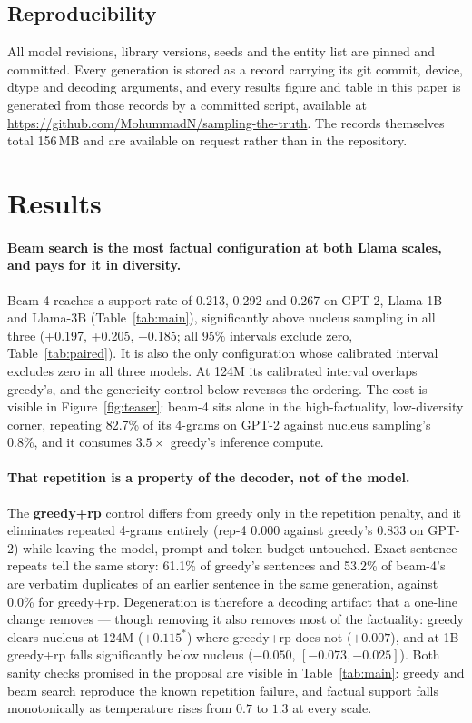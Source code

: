 \documentclass[11pt]{article}
\begin{document}
\subsection{Reproducibility}

All model revisions, library versions, seeds and the entity list are pinned and
committed. Every generation is stored as a record carrying its git commit,
device, dtype and decoding arguments, and every results figure and table in
this paper is generated from those records by a committed script, available at
\url{https://github.com/MohummadN/sampling-the-truth}. The records themselves
total 156\,MB and are available on request rather than in the repository.



\section{Results}

\paragraph{Beam search is the most factual configuration at both Llama scales,
and pays for it in diversity.} Beam-4 reaches a support rate of 0.213, 0.292 and
0.267 on GPT-2, Llama-1B and Llama-3B (Table~\ref{tab:main}), significantly
above nucleus sampling in all three (+0.197, +0.205, +0.185; all 95\%
intervals exclude zero, Table~\ref{tab:paired}). It is also the only
configuration whose calibrated interval excludes zero in all three models. At
124M its calibrated interval overlaps greedy's, and the genericity control
below reverses the ordering. The cost is visible in Figure~\ref{fig:teaser}:
beam-4 sits alone in the
high-factuality, low-diversity corner, repeating 82.7\% of its 4-grams on GPT-2
against nucleus sampling's 0.8\%, and it consumes $3.5\times$ greedy's
inference compute.

\paragraph{That repetition is a property of the decoder, not of the model.}
The \textbf{greedy+rp} control differs from greedy only in the repetition
penalty, and it eliminates repeated 4-grams entirely (rep-4 $0.000$ against
greedy's $0.833$ on GPT-2) while leaving the model, prompt and token budget
untouched. Exact sentence repeats tell the same story: 61.1\% of greedy's
sentences and 53.2\% of beam-4's are verbatim duplicates of an earlier sentence
in the same generation, against 0.0\% for greedy+rp. Degeneration is therefore
a decoding artifact that a one-line change removes --- though removing it also
removes most of the factuality: greedy clears nucleus at 124M ($+0.115^{*}$)
where greedy+rp does not ($+0.007$), and at 1B greedy+rp falls significantly
below nucleus ($-0.050$, $[-0.073, -0.025]$). Both sanity checks promised in
the proposal are visible in Table~\ref{tab:main}: greedy and beam search
reproduce the known repetition failure, and factual support falls monotonically
as temperature rises from $0.7$ to $1.3$ at every scale.
\end{document}
